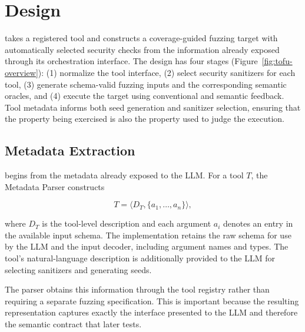\section{Design}
\label{sec:design}

\project{} takes a registered tool and constructs a coverage-guided fuzzing target with automatically selected security checks from the information already exposed through
its orchestration interface. The design has four stages
(Figure~\ref{fig:tofu-overview}): (1) normalize the tool interface,
(2) select security sanitizers for each tool,
(3) generate schema-valid fuzzing inputs and the corresponding semantic
oracles, and (4) execute the target using conventional and semantic feedback.
Tool metadata informs both seed generation and sanitizer selection, ensuring that the property being exercised is also the property used to judge the execution.

\subsection{Metadata Extraction}
\label{sec:design-metadata}

\project{} begins from the metadata already exposed to the LLM. For a tool
$T$, the Metadata Parser constructs

\[
T = \langle D_T,\{a_1,\ldots,a_n\}\rangle,
\]

where $D_T$ is the tool-level description and each argument $a_i$ denotes an entry in the available input schema. The implementation retains the raw schema for use by the LLM and the input decoder, including argument names and types. The tool's natural-language description is additionally provided to the LLM for selecting sanitizers and generating seeds.

The parser obtains this information through the tool registry rather than
requiring a separate fuzzing specification. This is important because the
resulting representation captures exactly the interface presented to the LLM
and therefore the semantic contract that \project{} later tests.

